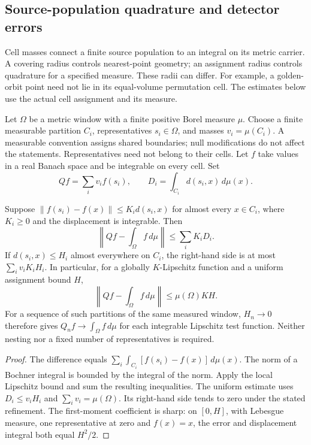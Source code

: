 \subsection{Source-population quadrature and detector errors}
\label{sec:source-population-quadrature}

Cell masses connect a finite source population to an integral on its metric
carrier. A covering radius controls nearest-point geometry; an assignment
radius controls quadrature for a specified measure. These radii can differ.
For example, a golden-orbit point need not lie in its equal-volume permutation
cell. The estimates below use the actual cell assignment and its measure.

Let $\Omega$ be a metric window with a finite positive Borel measure $\mu$.
Choose a finite measurable partition $C_i$, representatives $s_i\in\Omega$,
and masses $v_i=\mu(C_i)$. A measurable convention assigns shared boundaries;
null modifications do not affect the statements. Representatives need not
belong to their cells. Let $f$ take values in a real Banach space and be
integrable on every cell. Set
\[
 Qf=\sum_i v_i f(s_i),\qquad
 D_i=\int_{C_i}d(s_i,x)\,d\mu(x).
\]

\begin{proposition}
\label{prop:source-population-cell-transport}
Suppose
$\|f(s_i)-f(x)\|\le K_i d(s_i,x)$ for almost every $x\in C_i$,
where $K_i\ge0$ and the displacement is integrable. Then
\begin{equation}
 \left\|Qf-\int_\Omega f\,d\mu\right\|
 \le\sum_i K_i D_i.
 \label{eq:source-population-first-moment}
\end{equation}
If $d(s_i,x)\le H_i$ almost everywhere on $C_i$, the right-hand side is
at most $\sum_i v_iK_iH_i$. In particular, for a globally $K$-Lipschitz
function and a uniform assignment bound $H$,
\begin{equation}
 \left\|Qf-\int_\Omega f\,d\mu\right\|
 \le \mu(\Omega)KH.
 \label{eq:source-population-uniform-quadrature}
\end{equation}
For a sequence of such partitions of the same measured window, $H_n\to0$
therefore gives $Q_nf\to\int_\Omega f\,d\mu$ for each integrable Lipschitz
test function. Neither nesting nor a fixed number of representatives is
required.
\end{proposition}
\begin{proof}
The difference equals
$\sum_i\int_{C_i}[f(s_i)-f(x)]\,d\mu(x)$.
The norm of a Bochner integral is bounded by the integral of the norm.
Apply the local Lipschitz bound and sum the resulting inequalities.
The uniform estimate uses $D_i\le v_iH_i$ and
$\sum_i v_i=\mu(\Omega)$. Its right-hand side tends to zero under the
stated refinement. The first-moment coefficient is sharp: on $[0,H]$,
with Lebesgue measure, one representative at zero and $f(x)=x$, the error
and displacement integral both equal $H^2/2$.
\end{proof}

